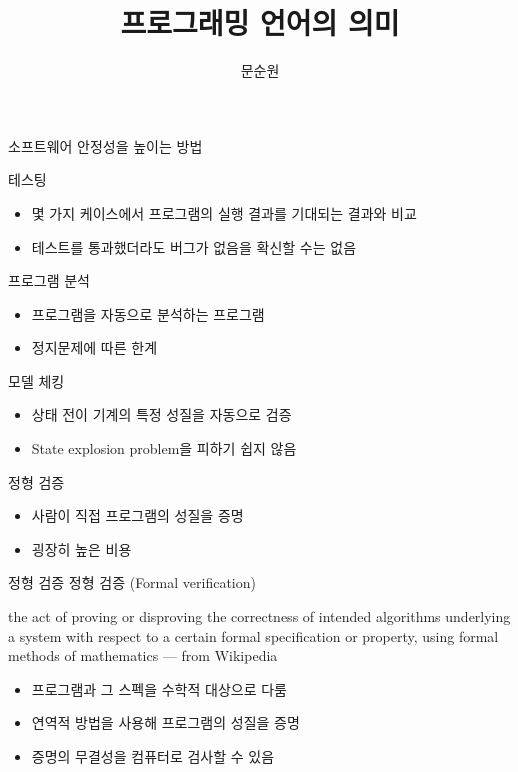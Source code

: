 \documentclass[10pt]{beamer}
\title{프로그래밍 언어의 의미}
\author{문순원}
\begin{document}
\begin{frame}
  \titlepage
\end{frame}

\begin{frame}{소프트웨어 안정성을 높이는 방법}
  \begin{block}{테스팅}
    \begin{itemize}
      \item 몇 가지 케이스에서 프로그램의 실행 결과를 기대되는 결과와 비교
      \item 테스트를 통과했더라도 버그가 없음을 확신할 수는 없음
    \end{itemize}
  \end{block}

 \pause
 \begin{block}{프로그램 분석}
   \begin{itemize}
     \item 프로그램을 자동으로 분석하는 프로그램
     \item 정지문제에 따른 한계
   \end{itemize}
 \end{block}

 \pause
  \begin{block}{모델 체킹}
    \begin{itemize}
      \item 상태 전이 기계의 특정 성질을 자동으로 검증
      \item State explosion problem을 피하기 쉽지 않음
    \end{itemize}
  \end{block}

 \pause
  \begin{block}{정형 검증}
    \begin{itemize}
      \item 사람이 직접 프로그램의 성질을 증명
      \item 굉장히 높은 비용
    \end{itemize}
  \end{block}
\end{frame}

\begin{frame}{정형 검증}
  정형 검증 (Formal verification)
  \begin{displayquote}
  the act of proving or disproving the correctness of intended algorithms underlying a system with respect to a certain formal specification or property, using formal methods of mathematics
  --- from Wikipedia
  \end{displayquote}
  \pause
  \begin{itemize}
    \item 프로그램과 그 스펙을 수학적 대상으로 다룸
    \item 연역적 방법을 사용해 프로그램의 성질을 증명
    \item 증명의 무결성을 컴퓨터로 검사할 수 있음
  \end{itemize}
\end{frame}
\end{document}
